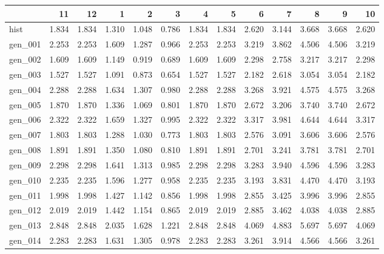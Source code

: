 \begin{tabular}{lrrrrrrrrrrrr}
\toprule
{} &     11 &     12 &     1  &     2  &     3  &     4  &     5  &     6  &     7  &     8  &     9  &     10 \\
\midrule
hist    &  1.834 &  1.834 &  1.310 &  1.048 &  0.786 &  1.834 &  1.834 &  2.620 &  3.144 &  3.668 &  3.668 &  2.620 \\
gen\_001 &  2.253 &  2.253 &  1.609 &  1.287 &  0.966 &  2.253 &  2.253 &  3.219 &  3.862 &  4.506 &  4.506 &  3.219 \\
gen\_002 &  1.609 &  1.609 &  1.149 &  0.919 &  0.689 &  1.609 &  1.609 &  2.298 &  2.758 &  3.217 &  3.217 &  2.298 \\
gen\_003 &  1.527 &  1.527 &  1.091 &  0.873 &  0.654 &  1.527 &  1.527 &  2.182 &  2.618 &  3.054 &  3.054 &  2.182 \\
gen\_004 &  2.288 &  2.288 &  1.634 &  1.307 &  0.980 &  2.288 &  2.288 &  3.268 &  3.921 &  4.575 &  4.575 &  3.268 \\
gen\_005 &  1.870 &  1.870 &  1.336 &  1.069 &  0.801 &  1.870 &  1.870 &  2.672 &  3.206 &  3.740 &  3.740 &  2.672 \\
gen\_006 &  2.322 &  2.322 &  1.659 &  1.327 &  0.995 &  2.322 &  2.322 &  3.317 &  3.981 &  4.644 &  4.644 &  3.317 \\
gen\_007 &  1.803 &  1.803 &  1.288 &  1.030 &  0.773 &  1.803 &  1.803 &  2.576 &  3.091 &  3.606 &  3.606 &  2.576 \\
gen\_008 &  1.891 &  1.891 &  1.350 &  1.080 &  0.810 &  1.891 &  1.891 &  2.701 &  3.241 &  3.781 &  3.781 &  2.701 \\
gen\_009 &  2.298 &  2.298 &  1.641 &  1.313 &  0.985 &  2.298 &  2.298 &  3.283 &  3.940 &  4.596 &  4.596 &  3.283 \\
gen\_010 &  2.235 &  2.235 &  1.596 &  1.277 &  0.958 &  2.235 &  2.235 &  3.193 &  3.831 &  4.470 &  4.470 &  3.193 \\
gen\_011 &  1.998 &  1.998 &  1.427 &  1.142 &  0.856 &  1.998 &  1.998 &  2.855 &  3.425 &  3.996 &  3.996 &  2.855 \\
gen\_012 &  2.019 &  2.019 &  1.442 &  1.154 &  0.865 &  2.019 &  2.019 &  2.885 &  3.462 &  4.038 &  4.038 &  2.885 \\
gen\_013 &  2.848 &  2.848 &  2.035 &  1.628 &  1.221 &  2.848 &  2.848 &  4.069 &  4.883 &  5.697 &  5.697 &  4.069 \\
gen\_014 &  2.283 &  2.283 &  1.631 &  1.305 &  0.978 &  2.283 &  2.283 &  3.261 &  3.914 &  4.566 &  4.566 &  3.261 \\

\end{tabular}
